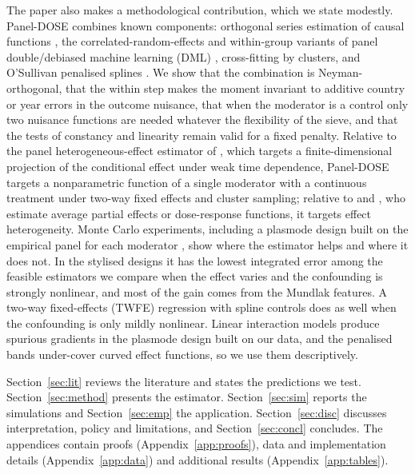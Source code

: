 \documentclass[pdflatex,sn-basic]{sn-jnl}%
\theoremstyle{thmstyleone}
\theoremstyle{thmstyletwo}
\begin{document}
The paper also makes a methodological contribution, which we state modestly. Panel-DOSE combines known components: orthogonal series estimation of causal functions \citep{semenova2021cate}, the correlated-random-effects and within-group variants of panel double/debiased machine learning (DML) \citep{clarke2023panel}, cross-fitting by clusters, and O'Sullivan penalised splines \citep{osullivan1986,wand2008osullivan}. We show that the combination is Neyman-orthogonal, that the within step makes the moment invariant to additive country or year errors in the outcome nuisance, that when the moderator is a control only two nuisance functions are needed whatever the flexibility of the sieve, and that the tests of constancy and linearity remain valid for a fixed penalty. Relative to the panel heterogeneous-effect estimator of \citet{semenova2023panel}, which targets a finite-dimensional projection of the conditional effect under weak time dependence, Panel-DOSE targets a nonparametric function of a single moderator with a continuous treatment under two-way fixed effects and cluster sampling; relative to \citet{klosin2022continuous} and \citet{colangelo2026continuous}, who estimate average partial effects or dose-response functions, it targets effect heterogeneity. Monte Carlo experiments, including a plasmode design built on the empirical panel for each moderator \citep{franklin2014plasmode}, show where the estimator helps and where it does not. In the stylised designs it has the lowest integrated error among the feasible estimators we compare when the effect varies and the confounding is strongly nonlinear, and most of the gain comes from the Mundlak features. A two-way fixed-effects (TWFE) regression with spline controls does as well when the confounding is only mildly nonlinear. Linear interaction models produce spurious gradients in the plasmode design built on our data, and the penalised bands under-cover curved effect functions, so we use them descriptively.

Section~\ref{sec:lit} reviews the literature and states the predictions we test. Section~\ref{sec:method} presents the estimator. Section~\ref{sec:sim} reports the simulations and Section~\ref{sec:emp} the application. Section~\ref{sec:disc} discusses interpretation, policy and limitations, and Section~\ref{sec:concl} concludes. The appendices contain proofs (Appendix~\ref{app:proofs}), data and implementation details (Appendix~\ref{app:data}) and additional results (Appendix~\ref{app:tables}).

\end{document}
